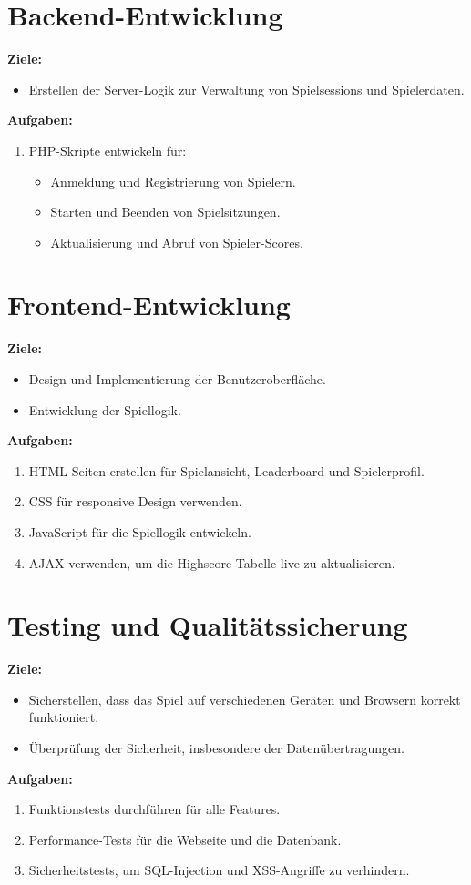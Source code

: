 \documentclass{article}
\begin{document}
	\section{Backend-Entwicklung}
	\textbf{Ziele:}
	\begin{itemize}
		\item Erstellen der Server-Logik zur Verwaltung von Spielsessions und Spielerdaten.
	\end{itemize}
	\textbf{Aufgaben:}
	\begin{enumerate}
		\item PHP-Skripte entwickeln für:
		\begin{itemize}
			\item Anmeldung und Registrierung von Spielern.
			\item Starten und Beenden von Spielsitzungen.
			\item Aktualisierung und Abruf von Spieler-Scores.
		\end{itemize}
	\end{enumerate}
	
	\section{Frontend-Entwicklung}
	\textbf{Ziele:}
	\begin{itemize}
		\item Design und Implementierung der Benutzeroberfläche.
		\item Entwicklung der Spiellogik.
	\end{itemize}
	\textbf{Aufgaben:}
	\begin{enumerate}
		\item HTML-Seiten erstellen für Spielansicht, Leaderboard und Spielerprofil.
		\item CSS für responsive Design verwenden.
		\item JavaScript für die Spiellogik entwickeln.
		\item AJAX verwenden, um die Highscore-Tabelle live zu aktualisieren.
	\end{enumerate}
	
	\section{Testing und Qualitätssicherung}
	\textbf{Ziele:}
	\begin{itemize}
		\item Sicherstellen, dass das Spiel auf verschiedenen Geräten und Browsern korrekt funktioniert.
		\item Überprüfung der Sicherheit, insbesondere der Datenübertragungen.
	\end{itemize}
	\textbf{Aufgaben:}
	\begin{enumerate}
		\item Funktionstests durchführen für alle Features.
		\item Performance-Tests für die Webseite und die Datenbank.
		\item Sicherheitstests, um SQL-Injection und XSS-Angriffe zu verhindern.
	\end{enumerate}
	
\end{document}
